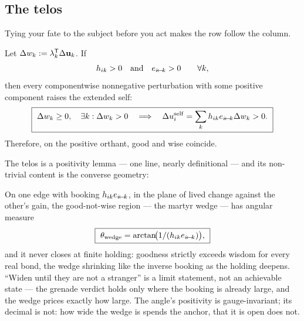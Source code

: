 \documentclass[../main]{subfiles}
\begin{document}
\subsection{The telos}
\label{subsec:conv:telos}
%
Tying your fate to the subject before you act makes the row follow the column.

\begin{theorem}
  Let $\Delta w\sb{k}:=\lambda\sb{k}\sp{\mathsf{T}}\Delta\mathbf{u}\sb{k}$. If
  \begin{equation}
    h\sb{ ik }>0
    \quad\text{and}\quad
    e\sb{ \ensuremath{i\!\leftarrow\!k} }>0
    \qquad\forall k,
    \label{eq:conv:positive-holding}
  \end{equation}
  then every componentwise nonnegative perturbation with some positive component raises the
  extended self:
  \begin{equation}
    \boxed{\
      \Delta w\sb{k}\ge0,
      \quad \exists k:\Delta w\sb{k}>0
      \quad\Longrightarrow\quad
      \Delta u\sb{i}\sp{\mathrm{self}}
      =\sum_kh\sb{ ik }e\sb{ \ensuremath{i\!\leftarrow\!k} }\Delta w\sb{k}>0.\ }
    \label{eq:conv:telos}
  \end{equation}
  Therefore, on the positive orthant, good and wise coincide.
\end{theorem}

The telos is a positivity lemma --- one line, nearly definitional --- and its
non-trivial content is the converse geometry:

\begin{theorem}[\hdr{nrm:wedge}]
  On one edge with booking $h\sb{ ik }e\sb{ \ensuremath{i\!\leftarrow\!k} }$, in the plane of lived
  change against the other's gain, the good-not-wise region --- the martyr wedge ---
  has angular measure
  \begin{equation}
    \boxed{\ \theta_{\mathrm{wedge}}
      =\arctan\!\bigl(1/(\holding{i}{k}\currency{i}{k})\bigr),\ }
    \label{eq:nrm:wedge}
  \end{equation}
  and it never closes at finite holding: goodness strictly exceeds wisdom for every
  real bond, the wedge shrinking like the inverse booking as the holding deepens.
  ``Widen until they are not a stranger'' is a limit statement, not an achievable
  state --- the grenade verdict holds only where the booking is already large, and
  the wedge prices exactly how large. The angle's positivity is gauge-invariant; its
  decimal is not: how wide the wedge is spends the anchor, that it is open does not.
\end{theorem}
\end{document}
